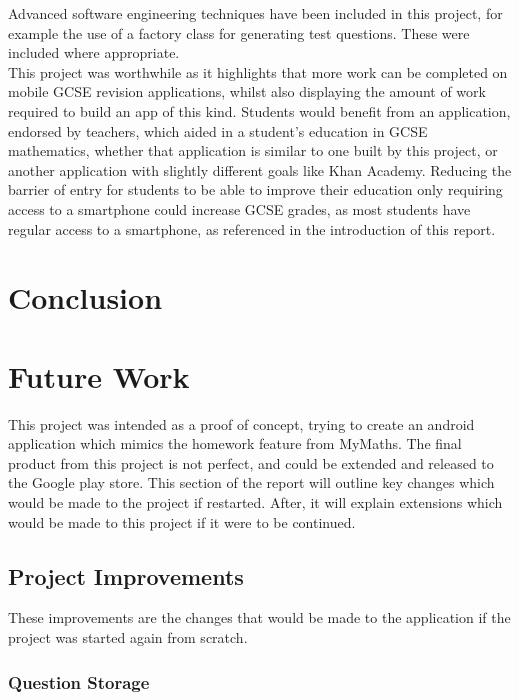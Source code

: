 \documentclass{article}
\begin{document}
Advanced software engineering techniques have been included in this project, for example the use of a factory class for generating test questions. These were included where appropriate. \\

This project was worthwhile as it highlights that more work can be completed on mobile GCSE revision applications, whilst also displaying the amount of work required to build an app of this kind. Students would benefit from an application, endorsed by teachers, which aided in a student's education in GCSE mathematics, whether that application is similar to one built by this project, or another application with slightly different goals like Khan Academy. Reducing the barrier of entry for students to be able to improve their education only requiring access to a smartphone could increase GCSE grades, as most students have regular access to a smartphone, as referenced in the introduction of this report. \\

\section{Conclusion}
\label{section:conclusion}

\section{Future Work}
\label{section:futureWork}

This project was intended as a proof of concept, trying to create an android application which mimics the homework feature from MyMaths. The final product from this project is not perfect, and could be extended and released to the Google play store. This section of the report will outline key changes which would be made to the project if restarted. After, it will explain extensions which would be made to this project if it were to be continued. \\

\subsection{Project Improvements}

These improvements are the changes that would be made to the application if the project was started again from scratch. 

\subsubsection{Question Storage}
\end{document}
